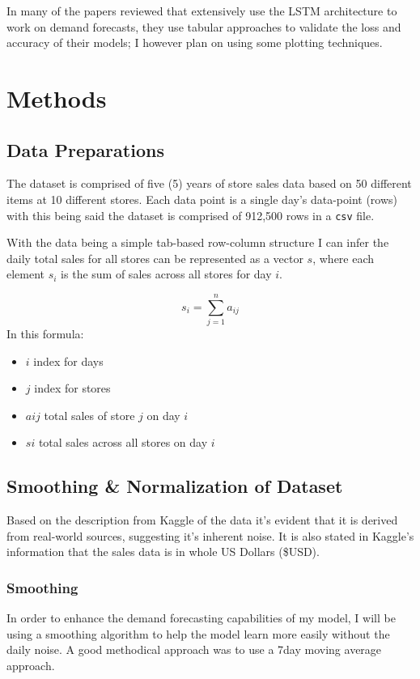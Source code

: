 \documentclass[10pt, journal, letterpaper, compsoc]{IEEEtran}
\begin{document}
In many of the papers reviewed\cite{pharma-sales-forecast-lstm, predicting-sales-lstm} that extensively use the LSTM architecture to work on demand forecasts, they use tabular approaches to validate the loss and accuracy of their models; I however  plan on using some plotting techniques.


\section{Methods}
\subsection{Data Preparations}
The dataset is comprised of five (5) years of store sales data based on 50 different items at 10 different stores. Each data point is a single day's data-point (rows) with this being said the dataset is comprised of 912,500 rows in a \texttt{csv} file.

With the data being a simple tab-based row-column structure I can infer the daily total sales for all stores can be represented as a vector $s$, where each element $s_i$ is the sum of sales across all stores for day $i$.

$$
s_i = \sum_{j=1}^{n} a_{ij}
$$
In this formula:
\begin{itemize}
    \item $i$ index for days
    \item $j$ index for stores
    \item $aij$ total sales of store $j$ on day $i$
    \item $si$ total sales across all stores on day $i$
\end{itemize}


\subsection{Smoothing \& Normalization of Dataset}
Based on the description from Kaggle\cite{demand-forecasting-kernels-only} of the data it's evident that it is derived from real-world sources, suggesting it's inherent noise. It is also stated in Kaggle's information that the sales data is in whole US Dollars (\$USD).
\subsubsection{Smoothing}
In order to enhance the demand forecasting capabilities of my model, I will be using a smoothing algorithm to help the model learn more easily without the daily noise. A good methodical approach was to use a 7day moving average approach.
\end{document}
